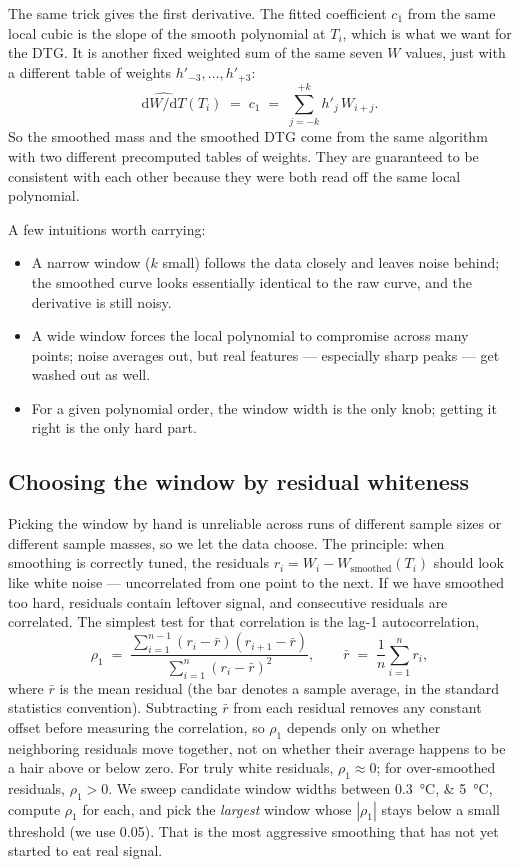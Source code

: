 \documentclass[11pt]{article}
\newcommand{\dwdT}{\mathrm{d}W/\mathrm{d}T}
\begin{document}
The same trick gives the first derivative. The fitted coefficient
$c_1$ from the same local cubic is the slope of the smooth polynomial
at $T_i$, which is what we want for the DTG. It is another fixed
weighted sum of the same seven $W$ values, just with a different table
of weights $h'_{-3}, \ldots, h'_{+3}$:
\[
  \widehat{\dwdT}(T_i)
  \;=\; c_1
  \;=\; \sum_{j=-k}^{+k} h'_j\, W_{i+j}.
\]
So the smoothed mass and the smoothed DTG come from the same algorithm
with two different precomputed tables of weights. They are guaranteed
to be consistent with each other because they were both read off the
same local polynomial.

A few intuitions worth carrying:
\begin{itemize}
  \item A narrow window ($k$ small) follows the data closely and
        leaves noise behind; the smoothed curve looks essentially
        identical to the raw curve, and the derivative is still noisy.
  \item A wide window forces the local polynomial to compromise across
        many points; noise averages out, but real features ---
        especially sharp peaks --- get washed out as well.
  \item For a given polynomial order, the window width is the only
        knob; getting it right is the only hard part.
\end{itemize}

\subsection{Choosing the window by residual whiteness}

Picking the window by hand is unreliable across runs of different
sample sizes or different sample masses, so we let the data choose.
The principle: when smoothing is correctly tuned, the residuals
$r_i = W_i - W_{\mathrm{smoothed}}(T_i)$ should look like white noise
--- uncorrelated from one point to the next. If we have smoothed too
hard, residuals contain leftover signal, and consecutive residuals are
correlated. The simplest test for that correlation is the lag-1
autocorrelation,
\[
  \rho_1 \;=\; \frac{\sum_{i=1}^{n-1}(r_i - \bar r)(r_{i+1} - \bar r)}
                    {\sum_{i=1}^{n}(r_i - \bar r)^2},
  \qquad
  \bar r \;=\; \frac{1}{n}\sum_{i=1}^{n} r_i,
\]
where $\bar r$ is the mean residual (the bar denotes a sample
average, in the standard statistics convention). Subtracting $\bar r$
from each residual removes any constant offset before measuring the
correlation, so $\rho_1$ depends only on whether neighboring
residuals move together, not on whether their average happens to be a
hair above or below zero.
For truly white residuals, $\rho_1 \approx 0$; for over-smoothed
residuals, $\rho_1 > 0$. We sweep candidate window widths between
\qtylist{0.3;5}{\celsius}, compute $\rho_1$ for each, and pick the
\emph{largest} window whose $|\rho_1|$ stays below a small threshold
(we use 0.05). That is the most aggressive smoothing that has not yet
started to eat real signal.
\end{document}

